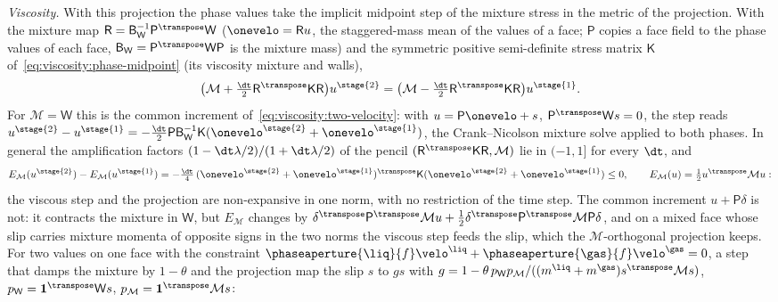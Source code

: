 \emph{Viscosity.} With this projection the phase values take the implicit
midpoint step of the mixture stress in the metric of the projection. With the
mixture map $\mathsf R=\mathsf B_{\mathsf W}^{-1}\mathsf P^{\transpose}\mathsf W$
($\onevelo=\mathsf Ru$, the staggered-mass mean of the values of a face;
$\mathsf P$ copies a face field to the phase values of each face,
$\mathsf B_{\mathsf W}=\mathsf P^{\transpose}\mathsf W\mathsf P$ is the mixture mass)
and the symmetric positive semi-definite stress matrix $\mathsf K$
of~\cref{eq:viscosity:phase-midpoint} (its viscosity mixture and walls),
\begin{equation}\label{eq:projection:mimetic-viscous}
  \bigl(\mathcal M+\tfrac{\dt}2\mathsf R^{\transpose}\mathsf K\mathsf R\bigr)u^{\stage{2}}
  =\bigl(\mathcal M-\tfrac{\dt}2\mathsf R^{\transpose}\mathsf K\mathsf R\bigr)u^{\stage{1}} .
\end{equation}
For $\mathcal M=\mathsf W$ this is the common increment
of~\cref{eq:viscosity:two-velocity}: with $u=\mathsf P\onevelo+s$,
$\mathsf P^{\transpose}\mathsf Ws=0$, the step reads
$u^{\stage{2}}-u^{\stage{1}}=-\tfrac{\dt}2\mathsf P\mathsf B_{\mathsf W}^{-1}\mathsf K(\onevelo^{\stage{2}}+\onevelo^{\stage{1}})$,
the Crank--Nicolson mixture solve applied to both phases. In general the
amplification factors $(1-\dt\lambda/2)/(1+\dt\lambda/2)$ of the pencil
$(\mathsf R^{\transpose}\mathsf K\mathsf R,\mathcal M)$ lie in $(-1,1]$ for every
$\dt$, and
\[
  E_{\mathcal M}(u^{\stage{2}})-E_{\mathcal M}(u^{\stage{1}})
  =-\tfrac{\dt}4\,(\onevelo^{\stage{2}}+\onevelo^{\stage{1}})^{\transpose}\mathsf K(\onevelo^{\stage{2}}+\onevelo^{\stage{1}})\le0,
  \qquad E_{\mathcal M}(u)=\tfrac12u^{\transpose}\mathcal Mu :
\]
the viscous step and the projection are non-expansive in one norm, with no
restriction of the time step. The common increment $u+\mathsf P\delta$ is not:
it contracts the mixture in $\mathsf W$, but $E_{\mathcal M}$ changes by
$\delta^{\transpose}\mathsf P^{\transpose}\mathcal Mu+\tfrac12\delta^{\transpose}\mathsf P^{\transpose}\mathcal M\mathsf P\delta$,
and on a mixed face whose slip carries mixture momenta of opposite signs in
the two norms the viscous step feeds the slip, which the $\mathcal M$-orthogonal
projection keeps. For two values on one face with the constraint
$\phaseaperture{\liq}{f}\velo^{\liq}+\phaseaperture{\gas}{f}\velo^{\gas}=0$, a
step that damps the mixture by $1-\theta$ and the projection map the slip $s$
to $gs$ with $g=1-\theta\,p_{\mathsf W}p_{\mathcal M}/((m^{\liq}+m^{\gas})s^{\transpose}\mathcal Ms)$,
$p_{\mathsf W}=\mathbf 1^{\transpose}\mathsf Ws$, $p_{\mathcal M}=\mathbf 1^{\transpose}\mathcal Ms$:
